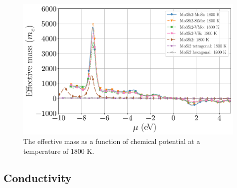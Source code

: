 \documentclass[7.5pt]{article}
\theoremstyle{plain}
\theoremstyle{definition}
\newcommand{\<}{\langle}
\renewcommand{\>}{\rangle}
\begin{document}
\begin{figure}[b!]
\centering
  \includegraphics[width=\textwidth]{allmats_E_mu_temp_n}
\caption{The effective mass as a function of chemical potential at a temperature of 1800 K.}
\label{fig:E-mu}
\end{figure}


\pagebreak
\clearpage
\subsection{Conductivity}
\end{document}
